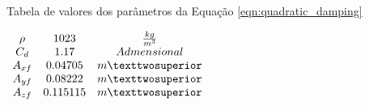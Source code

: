 \begin{table}[H]
	\centering
	\label{tab:quadratic_damping_param_value}
	\caption{Tabela de valores dos parâmetros da Equação \ref{eqn:quadratic_damping}}
	$\begin{array}{c c c}
		\begin{matrix} 
			\rho & 1023 & \frac{kg}{m^{3}} \\ 
			C_d &  1.17 & Admensional \\
			A_{xf} & 0.04705 & m² \\
			A_{yf} & 0.08222 & m² \\
			A_{zf} & 0.115115 & m² 
		\end{matrix}
	\end{array}$
\end{table}


%


